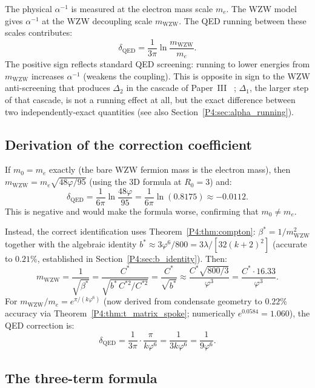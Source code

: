 \documentclass[11pt,a4paper]{article}
\theoremstyle{definition}
\theoremstyle{remark}
\newcommand{\vp}{\varphi}
\newcommand{\bst}{\beta^{*}}
\newcommand{\aInv}{\alpha^{-1}}
\newcommand{\mWZW}{m_{\mathrm{WZW}}}
\begin{document}
The physical $\alpha^{-1}$ is measured at the electron mass scale $m_e$.
The WZW model gives $\alpha^{-1}$ at the WZW decoupling scale $\mWZW$.
The QED running between these scales contributes:
\begin{equation}
  \delta_\text{QED}
  = \frac{1}{3\pi}\ln\frac{\mWZW}{m_e}.
  \label{P4:eq:delta_qed}
\end{equation}
The positive sign reflects standard QED screening: running to lower energies
from $\mWZW$ increases $\aInv$ (weakens the coupling).  This is opposite
in sign to the WZW anti-screening that produces $\Delta_2$ in
the cascade of Paper~III~\cite{Paper3}%
; $\Delta_1$, the larger step of that cascade, is not a running
effect at all, but the exact difference between two independently-exact
quantities (see also Section~\ref{P4:sec:alpha_running}).

\subsection{Derivation of the correction coefficient}

If $m_0 = m_e$ exactly (the bare WZW fermion mass is the electron mass),
then $\mWZW = m_e\sqrt{48\vp/95}$ (using the 3D formula at $R_0=3$) and:
\[
  \delta_\text{QED}
  = \frac{1}{6\pi}\ln\frac{48\vp}{95}
  = \frac{1}{6\pi}\ln(0.8175)
  \approx -0.0112.
\]
This is negative and would make the formula worse, confirming that $m_0\neq m_e$.

Instead, the correct identification uses Theorem~\ref{P4:thm:compton}:
$\bst = 1/\mWZW^2$ together with the algebraic identity $b^* \approx
3\vp^6/800 = 3\lambda/[32(k+2)^2]$ (accurate to $0.21\%$,
established in Section~\ref{P4:sec:b_identity}).  Then:
\begin{equation}
  \mWZW = \frac{1}{\sqrt{\bst}} = \frac{C^*}{\sqrt{b^*\,C^{*2}/C^{*2}}}
  = \frac{C^*}{\sqrt{b^*}}
  \approx \frac{C^*\sqrt{800/3}}{\vp^3}
  = \frac{C^*\cdot 16.33}{\vp^3}.
  \label{P4:eq:mwzw_from_b}
\end{equation}
For $\mWZW/m_e = e^{\pi/(k\vp^6)}$ (now derived from condensate geometry
to $0.22\%$ accuracy via Theorem~\ref{P4:thm:t_matrix_spoke}; numerically
$e^{0.0584} = 1.060$), the QED correction is:
\begin{equation}
  \delta_\text{QED}
  = \frac{1}{3\pi}\cdot\frac{\pi}{k\vp^6}
  = \frac{1}{3k\vp^6}
  = \frac{1}{9\vp^6}.
  \label{P4:eq:delta_exact}
\end{equation}

\subsection{The three-term formula}
\end{document}
